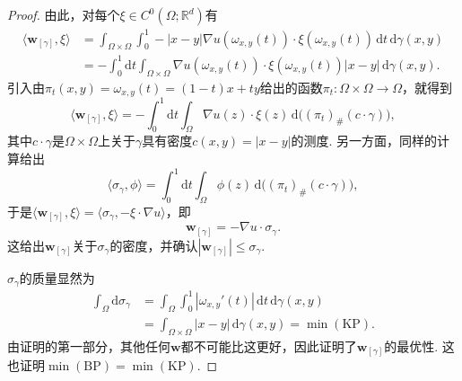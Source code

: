 \begin{proof}
由此，对每个$\xi\in C^0(\Omega;\mathbb R^d)$有
\begin{equation*}
\begin{aligned}
 \langle\mathbf w_{[\gamma]},\xi\rangle
 &=\int_{\Omega\times\Omega}\int_0^1
    -|x-y|\nabla u(\omega_{x,y}(t))\cdot\xi(\omega_{x,y}(t))
                           \,\mathrm dt\,\mathrm d\gamma(x,y)\\
 &=-\int_0^1\mathrm dt\int_{\Omega\times\Omega}
    \nabla u(\omega_{x,y}(t))\cdot\xi(\omega_{x,y}(t))
                             |x-y|\,\mathrm d\gamma(x,y).
\end{aligned}
\end{equation*}
引入由$\pi_t(x,y)=\omega_{x,y}(t)=(1-t)x+ty$给出的函数$\pi_t:\Omega\times\Omega\to\Omega$，就得到
\[
 \langle\mathbf w_{[\gamma]},\xi\rangle
 =-\int_0^1\mathrm dt\int_\Omega\nabla u(z)\cdot\xi(z)
                           \,\mathrm d\bigl((\pi_t)_\#(c\cdot\gamma)\bigr),
\]
其中$c\cdot\gamma$是$\Omega\times\Omega$上关于$\gamma$具有密度$c(x,y)=|x-y|$的测度. 另一方面，同样的计算给出
\begin{equation}\label{eq:4.6}
 \langle\sigma_\gamma,\phi\rangle
 =\int_0^1\mathrm dt\int_\Omega\phi(z)
                       \,\mathrm d\bigl((\pi_t)_\#(c\cdot\gamma)\bigr),
\end{equation}
于是$\langle\mathbf w_{[\gamma]},\xi\rangle=\langle\sigma_\gamma,-\xi\cdot\nabla u\rangle$，即
\[
 \mathbf w_{[\gamma]}=-\nabla u\cdot\sigma_\gamma.
\]
这给出$\mathbf w_{[\gamma]}$关于$\sigma_\gamma$的密度，并确认$|\mathbf w_{[\gamma]}|\leq\sigma_\gamma$.

$\sigma_\gamma$的质量显然为
\begin{equation*}
\begin{aligned}
 \int_\Omega\mathrm d\sigma_\gamma
 &=\int_\Omega\int_0^1|\omega_{x,y}'(t)|\,\mathrm dt\,\mathrm d\gamma(x,y)\\
 &=\int_{\Omega\times\Omega}|x-y|\,\mathrm d\gamma(x,y)
  =\min\hyperref[obj:1.2]{(\mathrm{KP})}.
\end{aligned}
\end{equation*}
由证明的第一部分，其他任何$\mathbf w$都不可能比这更好，因此证明了$\mathbf w_{[\gamma]}$的最优性. 这也证明$\min\hyperref[obj:4.5]{(\mathrm{BP})}=\min\hyperref[obj:1.2]{(\mathrm{KP})}$.
\end{proof}

